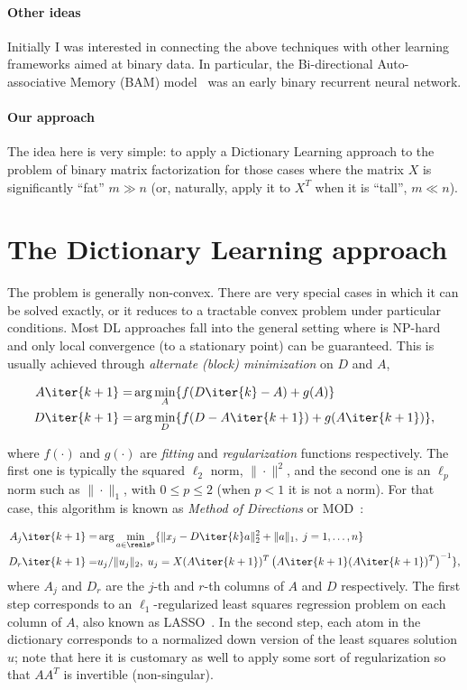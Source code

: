 \documentclass[a4paper,11pt]{article}
\begin{document}
\paragraph{Other ideas} Initially I was interested in connecting the above techniques with other learning frameworks aimed at binary data. In particular, the Bi-directional Auto-associative Memory (BAM) model~\cite{bam} was an early binary recurrent neural network.


\paragraph{Our approach} The idea here is very simple: to apply a Dictionary Learning approach to the problem of binary matrix factorization for those cases where the matrix $X$ is significantly ``fat'' $m \gg n$ (or, naturally, apply it to $X^T$ when it is ``tall'', $m \ll n$). 

\section{The Dictionary Learning approach}

The problem  is generally non-convex. There are very special cases in which it can be solved exactly, or it reduces to a tractable convex problem under particular conditions. Most DL approaches fall into the general setting where  is NP-hard and only local convergence (to a stationary point) can be guaranteed. This is usually achieved through \emph{alternate (block) minimization} on $D$ and $A$,

\begin{eqnarray}
A\iter{k+1} =& \arg\min_{A} \{ f(D\iter{k}-A) + g(A) \} \\
D\iter{k+1} =& \arg\min_{D} \{ f(D-A\iter{k+1}) + g(A\iter{k+1}) \},
\label{eq:dl}
\end{eqnarray}

where $f(\cdot)$ and $g(\cdot)$ are \emph{fitting} and \emph{regularization} functions respectively. The first one is typically the squared $\ell_2$ norm, $\|\cdot\|^2$, and the second one is an $\ell_p$ norm such as $\|\cdot\|_1$, with $0 \leq p \leq 2$ (when $p < 1$ it is not a norm). For that case, this algorithm is known as \emph{Method of Directions} or MOD~\cite{mod}:

\begin{eqnarray}
A_j\iter{k+1} =& \arg\min_{a \in \reals^p} \{ \|x_j - D\iter{k}a \|_2^2 + \|a\|_1,  \; j=1,\ldots,n \} \\
D_r\iter{k+1} =& u_j/\|u_j\|_2,\;u_j = X(A\iter{k+1})^T\left(A\iter{k+1}(A\iter{k+1})^T\right)^{-1} \}, 
\label{eq:mod}
\end{eqnarray}
where $A_j$ and $D_r$ are the $j$-th and $r$-th columns of $A$ and $D$ respectively. The first step corresponds to an $\ell_1$-regularized least squares regression problem on each column of $A$, also known as LASSO~\cite{lasso}.
In the second step, each atom in the dictionary corresponds to a normalized down version of the least squares solution $u$; note that here it is customary as well to apply some sort of regularization so that $AA^T$ is invertible (non-singular).
\end{document}
